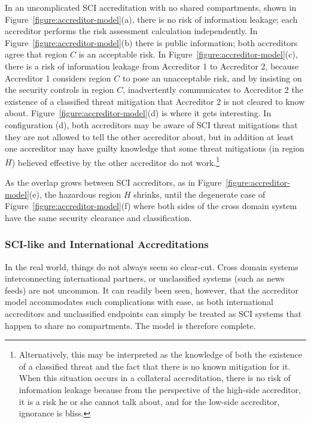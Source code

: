 \documentclass[10pt,letterpaper,conference]{IEEEtran}
\begin{document}
In an uncomplicated SCI accreditation with no shared compartments, shown in
Figure~\ref{figure:accreditor-model}(a), there is no risk of information leakage; each accreditor
performs the risk assessment calculation independently.  In Figure~\ref{figure:accreditor-model}(b)
there is public information; both accreditors agree that region $C$ is an acceptable risk.  In
Figure~\ref{figure:accreditor-model}(c), there is a risk of information leakage from Accreditor 1
to Accreditor 2, because Accreditor 1 considers region $C$ to pose an unacceptable risk, and by
insisting on the security controls in region $C$, inadvertently communicates to Accreditor 2 the
existence of a classified threat mitigation that Accreditor 2 is not cleared to know about.
Figure~\ref{figure:accreditor-model}(d) is where it gets interesting.  In configuration (d), both
accreditors may be aware of SCI threat mitigations that they are not allowed to tell the other
accreditor about, but in addition at least one accreditor may have guilty knowledge that some
threat mitigations (in region $H$) believed effective by the other accreditor do not
work.\footnote{Alternatively, this may be interpreted as the knowledge of both the existence of
a classified threat and the fact that there is no known mitigation for it.  When this situation
occurs in a collateral accreditation, there is no risk of information leakage because from the
perspective of the high-side accreditor, it is a risk he or she cannot talk about, and for the
low-side accreditor, ignorance is bliss.}

As the overlap grows between SCI accreditors, as in Figure~\ref{figure:accreditor-model}(e), the
hazardous region $H$ shrinks, until the degenerate case of Figure~\ref{figure:accreditor-model}(f)
where both sides of the cross domain system have the same security clearance and classification.

\subsubsection{SCI-like and International Accreditations}

In the real world, things do not always seem so clear-cut.  Cross domain systems interconnecting
international partners, or unclassified systems (such as news feeds) are not uncommon.  It can
readily been seen, however, that the accreditor model accommodates such complications with ease, as
both international accreditors and unclassified endpoints can simply be treated as SCI systems that
happen to share no compartments.  The model is therefore complete.
\end{document}
